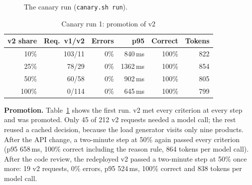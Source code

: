 \documentclass[conference]{IEEEtran}
\begin{document}
\begin{figure}[t]
\centering
{}
\caption{The canary run (\texttt{canary.sh run}).}
\label{fig:canary}
\end{figure}

\begin{table}[t]
\caption{Canary run 1: promotion of v2}
\label{tab:promotion}
\centering\small
\begin{tabular}{@{}rrrrrr@{}}
\toprule
v2 share & Req.\ v1/v2 & Errors & p95 & Correct & Tokens \\
\midrule
10\% & 103/11 & 0\% & 840\,ms & 100\% & 822 \\
25\% & 78/29 & 0\% & 1362\,ms & 100\% & 854 \\
50\% & 60/58 & 0\% & 902\,ms & 100\% & 805 \\
100\% & 0/114 & 0\% & 645\,ms & 100\% & 799 \\
\bottomrule
\end{tabular}
\end{table}

\textbf{Promotion.} Table~\ref{tab:promotion} shows the first run. v2 met
every criterion at every step and was promoted. Only 45 of 212 v2 requests
needed a model call; the rest reused a cached decision, because the load
generator visits only nine products. After the API change, a two-minute step
at 50\% again passed every criterion (p95 658\,ms, 100\% correct including
the reason rule, 864 tokens per model call). After the code review, the
redeployed v2 passed a two-minute step at 50\% once more: 19 v2 requests,
0\% errors, p95 524\,ms, 100\% correct and 838 tokens per model call.
\end{document}
